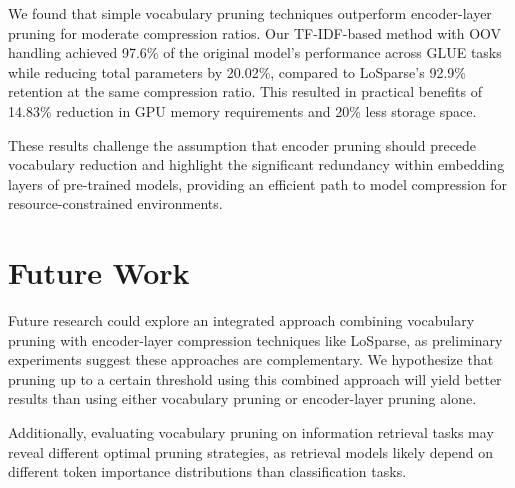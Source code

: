 \documentclass[twocolumn]{article}
\begin{document}
We found that simple vocabulary pruning techniques outperform encoder-layer pruning for moderate compression ratios. Our TF-IDF-based method with OOV handling achieved 97.6\% of the original model's performance across GLUE tasks while reducing total parameters by 20.02\%, compared to LoSparse's 92.9\% retention at the same compression ratio. This resulted in practical benefits of 14.83\% reduction in GPU memory requirements and 20\% less storage space.

These results challenge the assumption that encoder pruning should precede vocabulary reduction and highlight the significant redundancy within embedding layers of pre-trained models, providing an efficient path to model compression for resource-constrained environments.

\section{Future Work}
Future research could explore an integrated approach combining vocabulary pruning with encoder-layer compression techniques like LoSparse, as preliminary experiments suggest these approaches are complementary. We hypothesize that pruning up to a certain threshold using this combined approach will yield better results than using either vocabulary pruning or encoder-layer pruning alone.

Additionally, evaluating vocabulary pruning on information retrieval tasks may reveal different optimal pruning strategies, as retrieval models likely depend on different token importance distributions than classification tasks.

\newpage


\end{document}

